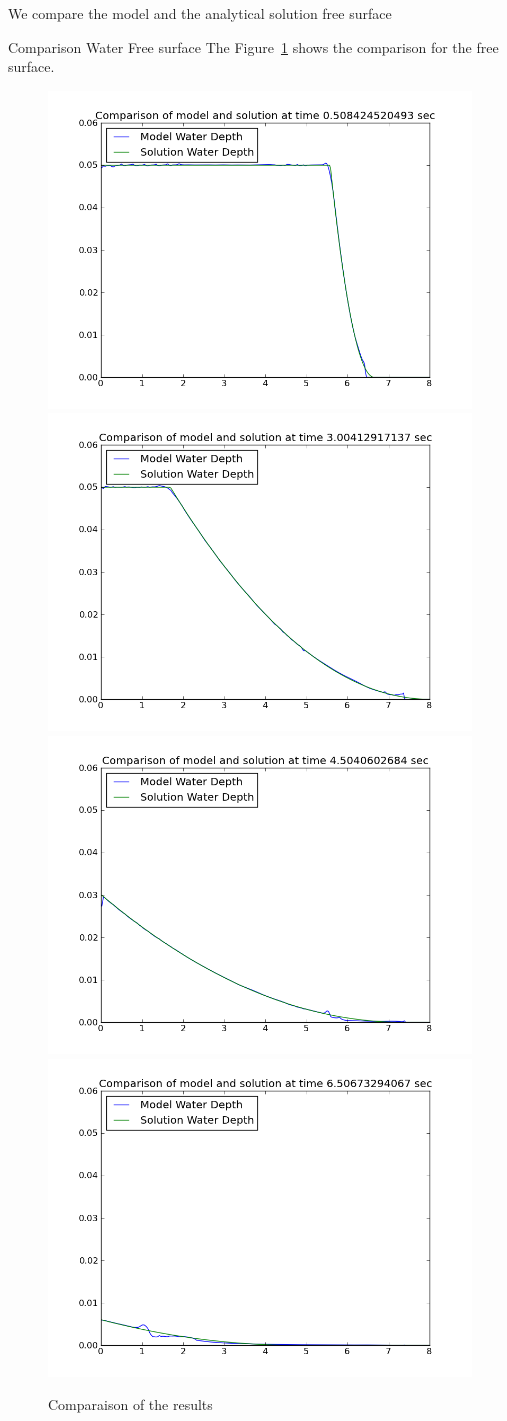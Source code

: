 We compare the model and the analytical solution free surface

Comparison Water Free surface
The Figure~\ref{fig:swash:res} shows the comparison for the free surface.
\begin{figure}
\centering
\includegraphics[width=.5\textwidth]{img/res_t0_5.png}
\includegraphics[width=.5\textwidth]{img/res_t3_0.png}
\includegraphics[width=.5\textwidth]{img/res_t4_5.png}
\includegraphics[width=.5\textwidth]{img/res_t6_5.png}
\caption{Comparaison of the results}\label{fig:swash:res}
\end{figure}

